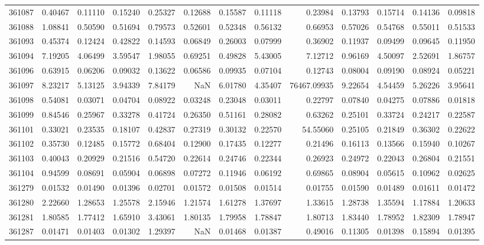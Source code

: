 \begin{tabular}{lrrrrrrrrrrrr}
361087 & 0.40467 & 0.11110 & 0.15240 & 0.25327 & 0.12688 & 0.15587 & 0.11118 & 0.23984 & 0.13793 & 0.15714 & 0.14136 & 0.09818 \\
361088 & 1.08841 & 0.50590 & 0.51694 & 0.79573 & 0.52601 & 0.52348 & 0.56132 & 0.66953 & 0.57026 & 0.54768 & 0.55011 & 0.51533 \\
361093 & 0.45374 & 0.12424 & 0.42822 & 0.14593 & 0.06849 & 0.26003 & 0.07999 & 0.36902 & 0.11937 & 0.09499 & 0.09645 & 0.11950 \\
361094 & 7.19205 & 4.06499 & 3.59547 & 1.98055 & 0.69251 & 0.49828 & 5.43005 & 7.12712 & 0.96169 & 4.50097 & 2.52691 & 1.86757 \\
361096 & 0.63915 & 0.06206 & 0.09032 & 0.13622 & 0.06586 & 0.09935 & 0.07104 & 0.12743 & 0.08004 & 0.09190 & 0.08924 & 0.05221 \\
361097 & 8.23217 & 5.13125 & 3.94339 & 7.84179 & NaN & 6.01780 & 4.35407 & 76467.09935 & 9.22654 & 4.54459 & 5.26226 & 3.95641 \\
361098 & 0.54081 & 0.03071 & 0.04704 & 0.08922 & 0.03248 & 0.23048 & 0.03011 & 0.22797 & 0.07840 & 0.04275 & 0.07886 & 0.01818 \\
361099 & 0.84546 & 0.25967 & 0.33278 & 0.41724 & 0.26350 & 0.51161 & 0.28082 & 0.63262 & 0.25101 & 0.33724 & 0.24217 & 0.22587 \\
361101 & 0.33021 & 0.23535 & 0.18107 & 0.42837 & 0.27319 & 0.30132 & 0.22570 & 54.55060 & 0.25105 & 0.21849 & 0.36302 & 0.22622 \\
361102 & 0.35730 & 0.12485 & 0.15772 & 0.68404 & 0.12900 & 0.17435 & 0.12277 & 0.21496 & 0.16113 & 0.13566 & 0.15940 & 0.10267 \\
361103 & 0.40043 & 0.20929 & 0.21516 & 0.54720 & 0.22614 & 0.24746 & 0.22344 & 0.26923 & 0.24972 & 0.22043 & 0.26804 & 0.21551 \\
361104 & 0.94599 & 0.08691 & 0.05904 & 0.06898 & 0.07272 & 0.11946 & 0.06192 & 0.69865 & 0.08904 & 0.05615 & 0.10962 & 0.02625 \\
361279 & 0.01532 & 0.01490 & 0.01396 & 0.02701 & 0.01572 & 0.01508 & 0.01514 & 0.01755 & 0.01590 & 0.01489 & 0.01611 & 0.01472 \\
361280 & 2.22660 & 1.28653 & 1.25578 & 2.15946 & 1.21574 & 1.61278 & 1.37697 & 1.33615 & 1.28738 & 1.35594 & 1.17884 & 1.20633 \\
361281 & 1.80585 & 1.77412 & 1.65910 & 3.43061 & 1.80135 & 1.79958 & 1.78847 & 1.80713 & 1.83440 & 1.78952 & 1.82309 & 1.78947 \\
361287 & 0.01471 & 0.01403 & 0.01302 & 1.29397 & NaN & 0.01468 & 0.01387 & 0.49016 & 0.11305 & 0.01398 & 0.15894 & 0.01395 \\

\end{tabular}
